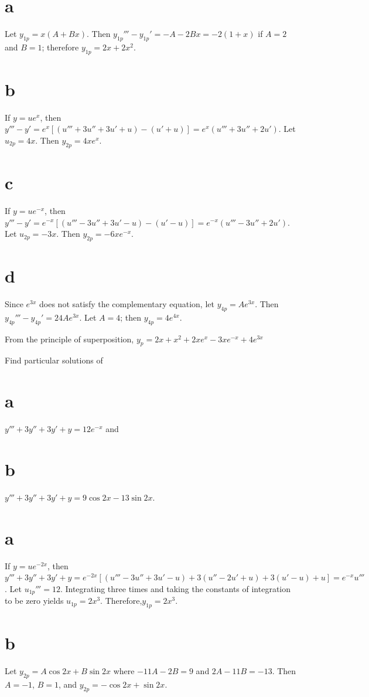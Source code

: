 \documentclass[dvips]{book}
\renewcommand{\exer}[1]{\par\medskip\;\noindent{\color{red}\bf #1.}}
\numberwithin{example}{section}
\numberwithin{equation}{section}
\numberwithin{theorem}{section}
\numberwithin{table}{section}
\numberwithin{figure}{section}
\begin{document}
\part{a} Let $y_{1p}=x(A+Bx)$. Then $y_{1p}'''-y_{1p}'=-A-2Bx=-2(1+x)$
if $A=2$ and $B=1$; therefore $y_{1p}=2x+2x^2$.

\part{b} If $y=ue^x$, then $y'''-y'=e^x [(u'''+3u''+3u'+u)
-(u'+u)]=e^x(u'''+3u''+2u')$. Let $u_{2p}=4x$. Then $y_{2p}=4xe^x$.

\part{c} If $y=ue^{-x}$, then $y'''-y'=e^{-x} [(u'''-3u''+3u'-u)
-(u'-u)]=e^{-x}(u'''-3u''+2u')$. Let $u_{2p}=-3x$. Then
$y_{2p}=-6xe^{-x}$.

\part{d} Since $e^{3x}$ does not satisfy the complementary equation,
let $y_{4p}=Ae^{3x}$. Then $y_{4p}'''-y_{4p}' =24Ae^{3x}$. Let $A=4$;
then $y_{4p}=4e^{4x}$.

From the principle of superposition,
$y_p=2x+x^2+2xe^x-3xe^{-x}+4e^{3x}$

\exer{9.3.52}
 Find particular solutions of
\part{a} $y'''+3y''+3y'+y=12e^{-x}$ and \part{b}
 $y'''+3y''+3y'+y=9\cos2x-13\sin2x$.

\part{a} If $y=ue^{-2x}$, then $y'''+3y''+3y'+y=e^{-2x}[
(u'''-3u''+3u'-u) +3(u''-2u'+u) +3(u'-u) +u]
=e^{-x}u'''$. Let $u_{1p}'''=12$. Integrating three times and
taking the constants of integration to be zero yields
$u_{1p}=2x^3$. Therefore,$y_{1p}=2x^3$.

\part{b}  Let $y_{2p}=A\cos2x+B\sin2x$ where
$-11A-2B=9$ and $2A-11B=-13$.
Then $A=-1$, $B=1$, and
 $y_{2p}=-\cos2x+\sin2x$.
\end{document}
